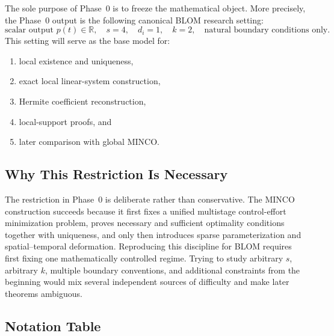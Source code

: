 The sole purpose of Phase~0 is to freeze the mathematical object.
More precisely, the Phase~0 output is the following canonical BLOM research setting:
\begin{equation}
\label{eq:phase0_setting}
\boxed{
\text{scalar output } p(t)\in\mathbb R,
\quad s=4,
\quad d_i=1,
\quad k=2,
\quad \text{natural boundary conditions only}.
}
\end{equation}
This setting will serve as the base model for:
\begin{enumerate}
  \item local existence and uniqueness,
  \item exact local linear-system construction,
  \item Hermite coefficient reconstruction,
  \item local-support proofs, and
  \item later comparison with global MINCO.
\end{enumerate}

\subsection{Why This Restriction Is Necessary}
\label{subsec:phase0_why}

The restriction in Phase~0 is deliberate rather than conservative.
The MINCO construction succeeds because it first fixes a unified multistage control-effort minimization problem, proves necessary and sufficient optimality conditions together with uniqueness, and only then introduces sparse parameterization and spatial--temporal deformation. Reproducing this discipline for BLOM requires first fixing one mathematically controlled regime. Trying to study arbitrary $s$, arbitrary $k$, multiple boundary conventions, and additional constraints from the beginning would mix several independent sources of difficulty and make later theorems ambiguous.

\subsection{Notation Table}
\label{subsec:phase0_notation}

